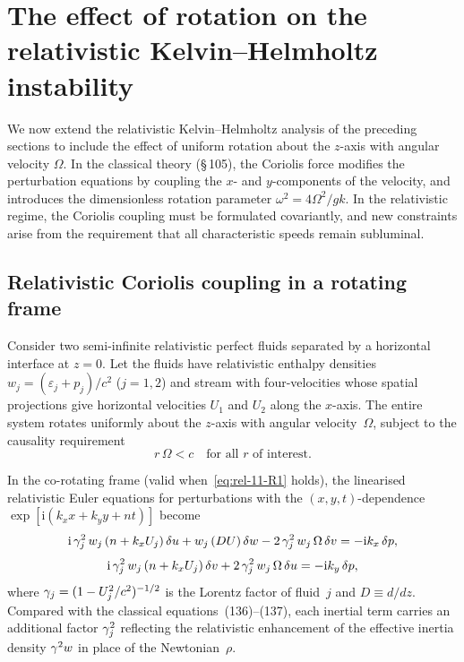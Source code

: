 
\section{The effect of rotation on the relativistic Kelvin--Helmholtz instability}
\label{sec:rel-11-105}

We now extend the relativistic Kelvin--Helmholtz analysis of the preceding
sections to include the effect of uniform rotation about the $z$-axis with
angular velocity $\Omega$.  In the classical theory (\S\,105), the Coriolis
force modifies the perturbation equations by coupling the $x$- and
$y$-components of the velocity, and introduces the dimensionless rotation
parameter $\omega^{2}=4\Omega^{2}/gk$.  In the relativistic regime,
the Coriolis coupling must be formulated covariantly, and new
constraints arise from the requirement that all characteristic speeds
remain subluminal.

\subsection{Relativistic Coriolis coupling in a rotating frame}
\label{sec:rel-11-105a}

Consider two semi-infinite relativistic perfect fluids separated by
a horizontal interface at $z=0$.  Let the fluids have relativistic
enthalpy densities $w_{j}=(\varepsilon_{j}+p_{j})/c^{2}$ ($j=1,2$)
and stream with four-velocities whose spatial projections give
horizontal velocities $U_{1}$ and $U_{2}$ along the $x$-axis.  The
entire system rotates uniformly about the $z$-axis with angular
velocity~$\Omega$, subject to the causality requirement
\begin{equation}
\label{eq:rel-11-R1}
\boxed{r\,\Omega < c \quad\text{for all } r \text{ of interest.}}
\end{equation}

In the co-rotating frame (valid when~\eqref{eq:rel-11-R1} holds),
the linearised relativistic Euler equations for perturbations with
the $(x,y,t)$-dependence $\exp[\mathrm{i}(k_{x}x+k_{y}y+nt)]$ become
\begin{equation}
\label{eq:rel-11-R2}
\mathrm{i}\,\gamma_{j}^{2}\,w_{j}\,(n+k_{x}U_{j})\,\delta u
+ w_{j}\,(DU)\,\delta w - 2\,\gamma_{j}^{2}\,w_{j}\,\Omega\,\delta v
= -\mathrm{i}k_{x}\,\delta p,
\end{equation}
\begin{equation}
\label{eq:rel-11-R3}
\mathrm{i}\,\gamma_{j}^{2}\,w_{j}\,(n+k_{x}U_{j})\,\delta v
+ 2\,\gamma_{j}^{2}\,w_{j}\,\Omega\,\delta u
= -\mathrm{i}k_{y}\,\delta p,
\end{equation}
where $\gamma_{j}=(1-U_{j}^{2}/c^{2})^{-1/2}$ is the Lorentz factor
of fluid~$j$ and $D\equiv d/dz$.  Compared with the classical
equations~(136)--(137), each inertial term carries an additional
factor $\gamma_{j}^{2}$ reflecting the relativistic enhancement of
the effective inertia density $\gamma^{2}w$ in place of the
Newtonian~$\rho$.


